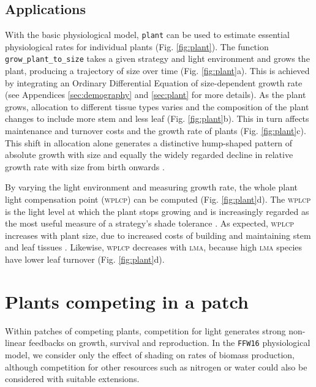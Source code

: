\documentclass[a4paper,11pt]{article}
\newcommand{\plant}{\texttt{plant}}
\begin{document}
\subsection{Applications}

With the basic physiological model, {\plant} can be used to estimate
essential physiological rates for individual plants
(Fig. \ref{fig:plant}). The function \texttt{grow\_plant\_to\_size}
takes a given strategy and light environment and grows the plant,
producing a trajectory of size over time (Fig. \ref{fig:plant}a). This
is achieved by integrating an Ordinary Differential Equation of
size-dependent growth rate (see Appendices \ref{sec:demography} and
\ref{sec:plant} for more details). As the plant grows, allocation to
different tissue types varies and the composition of the plant
changes to include more stem and less leaf
(Fig. \ref{fig:plant}b). This in turn affects maintenance and turnover
costs and the growth rate of plants (Fig. \ref{fig:plant}c).  This
shift in allocation alone generates a distinctive hump-shaped pattern
of absolute growth with size \citep{King-2011} and equally the widely
regarded decline in relative growth rate with size from birth onwards
\citep{Enquist-2007}.

By varying the light environment and measuring growth rate, the whole
plant light compensation point (\textsc{wplcp}) can be computed (Fig.
\ref{fig:plant}d). The \textsc{wplcp} is the light level at which the plant 
stops growing and is increasingly regarded as the most useful
measure of a strategy's shade tolerance
\citep{Givnish-1988, Baltzer-2007, Lusk-2013}. As expected, \textsc{wplcp}
increases with plant size, due to increased costs of building and
maintaining stem and leaf tissues \citep{Givnish-1988}. Likewise, \textsc{wplcp}
decreases with \textsc{lma}, because high \textsc{lma} species have lower leaf turnover
\citep{Baltzer-2007, Lusk-2013} (Fig.
\ref{fig:plant}d).

\section{Plants competing in a patch}

Within patches of competing plants, competition for light generates
strong non-linear feedbacks on growth, survival and reproduction. In the
\texttt{FFW16} physiological model, we consider only the effect of
shading on rates of biomass production, although competition for other
resources such as nitrogen or water could also be considered with
suitable extensions.
\end{document}
